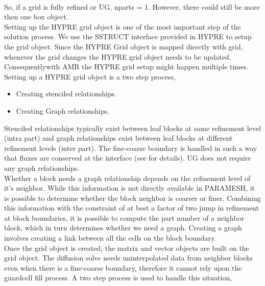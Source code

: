  \\

So, if a grid is fully refined or UG, nparts = 1. However, there could still be more then one box object. \\

Setting up the HYPRE grid object is one of the most important step of the solution process. We use the SSTRUCT interface 
provided in HYPRE to setup the grid object. Since the HYPRE Grid object is mapped directly with \flashx grid, whenever the 
\flashx grid changes the HYPRE grid object needs to be updated. Consequentlywith AMR the HYPRE grid setup might happen multiple times. \\

Setting up a HYPRE grid object is a two step process, 
\begin{itemize}
\item Creating stenciled relationships.
\item Creating Graph relationships.
\end{itemize}

Stenciled relationships typically exist between leaf blocks at same refinement level (intra part) and graph relationships exist 
between leaf blocks at different refinement levels (inter part). The
fine-coarse boundary is handled in such a way that fluxes are
conserved at the interface (see  for details). UG
does not require any graph relationships. \\

Whether a block needs a graph relationship depends on the refinement
level of it's neighbor. While this information is not directly
available in PARAMESH, it is possible to determine whether the block
neighbor is coarser or finer. Combining this information with the
constraint of at best a factor of two jump in refinement at block
boundaries, it is possible to compute the 
part number of a neighbor block, which in turn determines whether we need a graph. Creating a graph involves creating a link between all the cells on
the block boundary. \\

Once the grid object is created, the matrix and vector objects are
built on the grid object. The diffusion solve needs uninterpolated data from 
neighbor blocks even when there is a fine-coarse boundary, therefore
it cannot rely upon the guardcell fill process.
 A two step process is used to handle this situation, \\

